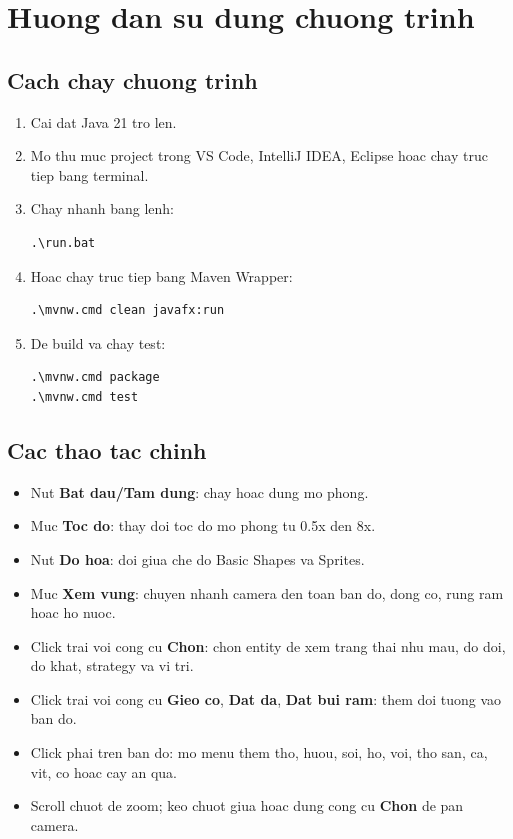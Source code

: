 \documentclass[12pt,a4paper]{article}
\begin{document}
\section{Huong dan su dung chuong trinh}

\subsection{Cach chay chuong trinh}

\begin{enumerate}
    \item Cai dat Java 21 tro len.
    \item Mo thu muc project trong VS Code, IntelliJ IDEA, Eclipse hoac chay truc tiep bang terminal.
    \item Chay nhanh bang lenh:
    \begin{verbatim}
.\run.bat
    \end{verbatim}
    \item Hoac chay truc tiep bang Maven Wrapper:
    \begin{verbatim}
.\mvnw.cmd clean javafx:run
    \end{verbatim}
    \item De build va chay test:
    \begin{verbatim}
.\mvnw.cmd package
.\mvnw.cmd test
    \end{verbatim}
\end{enumerate}

\subsection{Cac thao tac chinh}

\begin{itemize}
    \item Nut \textbf{Bat dau/Tam dung}: chay hoac dung mo phong.
    \item Muc \textbf{Toc do}: thay doi toc do mo phong tu 0.5x den 8x.
    \item Nut \textbf{Do hoa}: doi giua che do Basic Shapes va Sprites.
    \item Muc \textbf{Xem vung}: chuyen nhanh camera den toan ban do, dong co, rung ram hoac ho nuoc.
    \item Click trai voi cong cu \textbf{Chon}: chon entity de xem trang thai nhu mau, do doi, do khat, strategy va vi tri.
    \item Click trai voi cong cu \textbf{Gieo co}, \textbf{Dat da}, \textbf{Dat bui ram}: them doi tuong vao ban do.
    \item Click phai tren ban do: mo menu them tho, huou, soi, ho, voi, tho san, ca, vit, co hoac cay an qua.
    \item Scroll chuot de zoom; keo chuot giua hoac dung cong cu \textbf{Chon} de pan camera.
\end{itemize}
\end{document}

